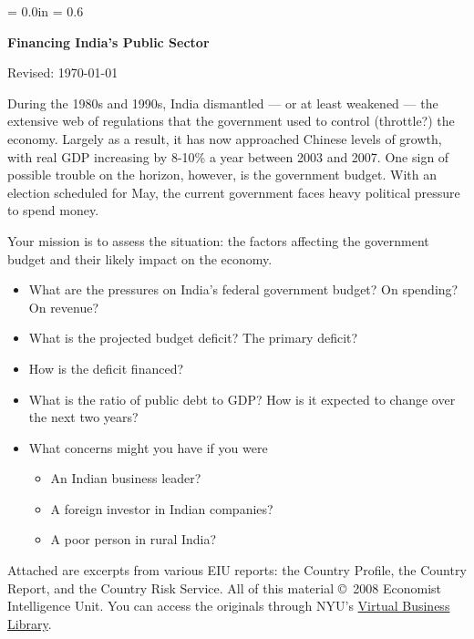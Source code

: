 \documentclass[letterpaper,12pt]{article}
\def\HeadName{Financing India's Public Sector}
\begin{document}
\parindent = 0.0in
\parskip = 0.6\bigskipamount
\thispagestyle{empty}%
\Head

\centerline{\large \bf \HeadName}%
\centerline{Revised:  \today}

\bigskip
During the 1980s and 1990s, 
India dismantled --- or at least weakened --- 
the extensive web of regulations 
that the government used to control (throttle?) the economy.
Largely as a result, it has now approached Chinese levels of growth, 
with real GDP increasing by 8-10\% a year between 2003 and 2007.
One sign of possible trouble on the horizon, however, is 
the government budget.
With an election scheduled for May,
the current government faces heavy political pressure 
to spend money.  

Your mission is to assess the situation:
the factors affecting the government budget 
and their likely impact on the economy.  
%
\begin{itemize}
\item What are the pressures on India's federal government budget?  
On spending?  On revenue?  
\item What is the projected budget deficit?  The primary deficit? 
\item How is the deficit financed?   
\item What is the ratio of public debt to GDP? 
How is it expected to change over the next two years?
\item What concerns might you have if you were
\begin{itemize}
\item An Indian business leader?  
\item A foreign investor in Indian companies?
\item A poor person in rural India?
\end{itemize}
\end{itemize}


Attached are excerpts from various EIU reports:
the Country Profile, the Country Report, and the Country Risk Service.
All of this material \copyright \ 2008 Economist Intelligence Unit. 
You can access the originals through NYU's 
\href{http://library.nyu.edu/vbl/}
{Virtual Business Library}.


\end{document}

